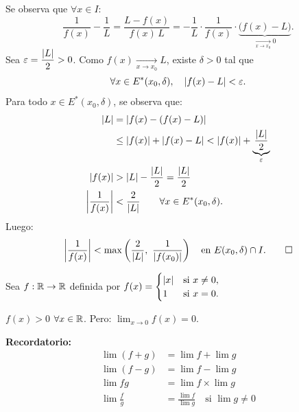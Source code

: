 \documentclass[11pt,a4paper]{article}
\newcommand{\Er}{E^{*}}                 %
\begin{document}
\begin{demo}
Se observa que $\forall x\in I$:
\[
  \frac{1}{f(x)}-\frac1L = \frac{L-f(x)}{f(x)\,L} = -\frac1L\cdot\frac{1}{f(x)}\cdot\underbrace{\big(f(x)-L\big)}_{\xrightarrow[x\to x_0]{}0}.
\]
Sea $\varepsilon=\dfrac{\abs{L}}{2}>0$. Como $f(x)\xrightarrow[x\to x_0]{}L$, existe $\delta>0$ tal que
\[
  \forall x\in\Er(x_0,\delta),\quad \abs{f(x)-L}<\varepsilon.
\]
Para todo $x\in\Er(x_0,\delta)$, se observa que:
\begin{align*}
  \abs{L} &= \abs{f(x)-(f(x)-L)}\\
  &\leq \abs{f(x)}+\abs{f(x)-L} < \abs{f(x)}+\underbrace{\frac{\abs{L}}{2}}_{\varepsilon}\\
  \abs{f(x)} &> \abs{L}-\frac{\abs{L}}{2} = \frac{\abs{L}}{2}\\
  \abs*{\frac{1}{f(x)}} &< \frac{2}{\abs{L}}\qquad\forall x\in\Er(x_0,\delta).
\end{align*}
Luego:
\[
  \abs*{\frac{1}{f(x)}} < \max\left(\frac{2}{\abs{L}},\ \frac{1}{\abs{f(x_0)}}\right)\quad\text{en } E(x_0,\delta)\cap I. \qedhere
\]
\end{demo}

\begin{observacion}
Sea $f:\R\to\R$ definida por $f(x)=\begin{cases}\abs{x} & \text{si } x\neq0,\\ 1 & \text{si } x=0.\end{cases}$

\begin{center}
\end{center}

$f(x)>0$ $\forall x\in\R$. Pero: $\displaystyle\lim_{x\to0}f(x)=0$.
\end{observacion}

\textbf{Recordatorio:}
\begin{align*}
  \lim(f+g) &= \lim f+\lim g\\
  \lim(f-g) &= \lim f-\lim g\\
  \lim fg &= \lim f\times\lim g\\
  \lim\frac fg &= \frac{\lim f}{\lim g}\quad\text{si } \lim g\neq0
\end{align*}
\end{document}
